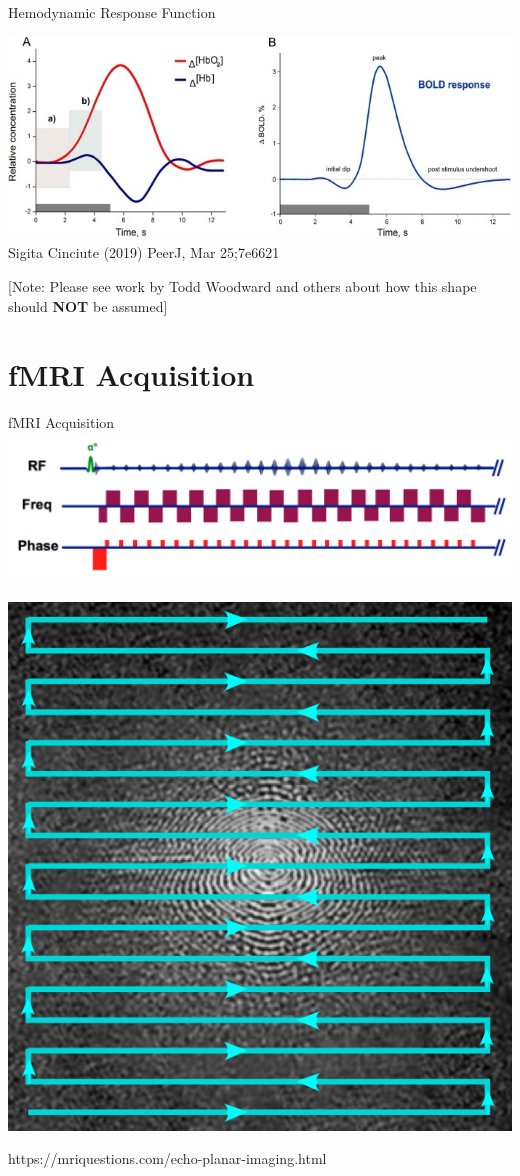 \documentclass[aspectratio=169,xcolor=dvipsnames]{beamer}
\begin{document}
\begin{frame}{Hemodynamic Response Function}

\includegraphics[width=1\textwidth]{imgs/HRF}
\tiny{Sigita Cinciute (2019) PeerJ, Mar 25;7e6621}

\normalsize{[Note: Please see work by Todd Woodward and others about how this shape should \textbf{NOT} be assumed]}
\end{frame}

\section{fMRI Acquisition}

\begin{frame}{fMRI Acquisition}
\includegraphics[width=.8\textwidth]{imgs/epipulsesignal}

\begin{center}
\includegraphics[width=.25\textwidth]{imgs/epikspace}
\end{center}

\tiny{https://mriquestions.com/echo-planar-imaging.html}
\end{frame}

\end{document}
